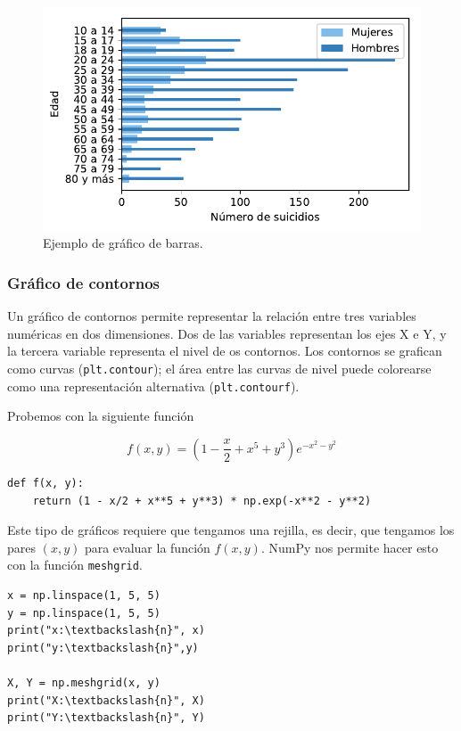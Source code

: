 \begin{figure}[H]
	\centering
	\includegraphics[width=13cm]{img/herramientas/grafico_barras}
	\caption{Ejemplo de gráfico de barras.}
	\label{fig:grafico_barras}
\end{figure}

\subsubsection{Gráfico de contornos}

Un gráfico de contornos permite representar la relación entre tres
variables numéricas en dos dimensiones. Dos de las variables representan
los ejes X e Y, y la tercera variable representa el nivel de os
contornos. Los contornos se grafican como curvas (\texttt{plt.contour});
el área entre las curvas de nivel puede colorearse como una
representación alternativa (\texttt{plt.contourf}).

Probemos con la siguiente función

\[f(x, y) = \left(1 - \frac{x}{2} + x^5 + y^3\right) e^{-x^2 - y^2}\]

\begin{listing}[H]
\begin{verbatim}
def f(x, y):
    return (1 - x/2 + x**5 + y**3) * np.exp(-x**2 - y**2)
\end{verbatim}
\end{listing}

Este tipo de gráficos requiere que tengamos una rejilla, es decir, que
tengamos los pares \((x, y)\) para evaluar la función \(f(x, y)\). NumPy
nos permite hacer esto con la función \texttt{meshgrid}.

\begin{listing}[H]
\begin{verbatim}
x = np.linspace(1, 5, 5)
y = np.linspace(1, 5, 5)
print("x:\textbackslash{n}", x)
print("y:\textbackslash{n}",y)

X, Y = np.meshgrid(x, y)
print("X:\textbackslash{n}", X)
print("Y:\textbackslash{n}", Y)
\end{verbatim}
\end{listing}

